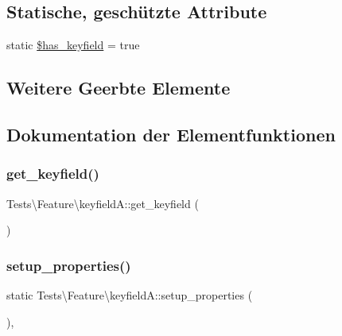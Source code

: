 \subsection*{Statische, geschützte Attribute}
\begin{DoxyCompactItemize}
\item 
static \hyperlink{classTests_1_1Feature_1_1keyfieldA_a9b0925216ff8bd4b8fe7882217c2cf57}{\$has\+\_\+keyfield} = true
\end{DoxyCompactItemize}
\subsection*{Weitere Geerbte Elemente}


\subsection{Dokumentation der Elementfunktionen}
\mbox{\label{classTests_1_1Feature_1_1keyfieldA_a8f32233408e0e139300173009478694d}} 
\subsubsection{\texorpdfstring{get\+\_\+keyfield()}{get\_keyfield()}}
{\footnotesize\ttfamily Tests\textbackslash{}\+Feature\textbackslash{}keyfield\+A\+::get\+\_\+keyfield (\begin{DoxyParamCaption}{ }\end{DoxyParamCaption})}

\mbox{\label{classTests_1_1Feature_1_1keyfieldA_a13d1cc7038ec91024d911fc55303a44d}} 
\subsubsection{\texorpdfstring{setup\+\_\+properties()}{setup\_properties()}}
{\footnotesize\ttfamily static Tests\textbackslash{}\+Feature\textbackslash{}keyfield\+A\+::setup\+\_\+properties (\begin{DoxyParamCaption}{ }\end{DoxyParamCaption})\hspace{0.3cm}{\ttfamily [static]}, {\ttfamily [protected]}}



